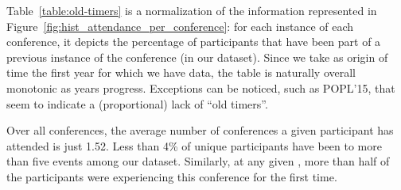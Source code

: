 Table~\ref{table:old-timers} is a normalization of the information represented
in Figure~\ref{fig:hist_attendance_per_conference}: for each instance of each
conference, it depicts the percentage of participants that have been part of a
previous instance of the conference (in our dataset). Since we take as origin of
time the first year for which we have data, the table is naturally overall monotonic
as years progress. Exceptions can be noticed, such as POPL'15, that seem to indicate
a (proportional) lack of ``old timers''.

\begin{obs}
Over all conferences, the average number of conferences a given participant
has attended is just 1.52. Less than 4\% of unique participants have been to
more than five events among our dataset.  Similarly, at any given \event,
more than half of the participants were experiencing this conference for the
first time.
\label{obs:old-timers}
\end{obs}


